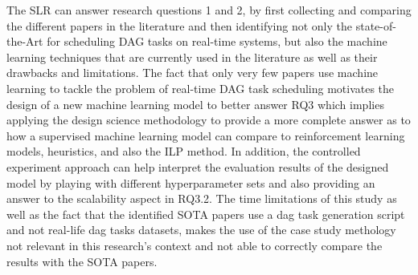 The SLR can answer research questions 1 and 2,
by first collecting and comparing the different papers in the literature
and then identifying not only the state-of-the-Art for scheduling DAG tasks on real-time systems,
but also the machine learning techniques that are currently used in the literature as well as their drawbacks and limitations.
The fact that only very few papers use machine learning to tackle the problem of real-time DAG task scheduling
motivates the design of a new machine learning model to better answer RQ3 which implies 
applying the design science methodology to provide a more complete answer as to how a supervised machine learning model 
can compare to reinforcement learning models, heuristics, and also the ILP method.
In addition, the controlled experiment approach can help interpret the evaluation results of the designed model by 
playing with different hyperparameter sets and also  
 providing an answer to the scalability aspect in RQ3.2.
The time limitations of this study as well as the fact that the identified SOTA papers
use a dag task generation script and not real-life dag tasks datasets, makes
the use of the case study methology not relevant in this research's context and not able to correctly compare the results with 
the SOTA papers. 


%
